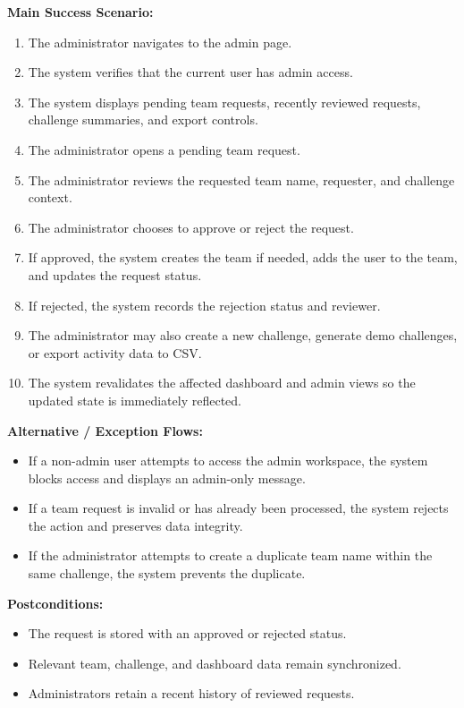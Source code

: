 \documentclass[12pt]{article}
\begin{document}
\textbf{Main Success Scenario:}
\begin{enumerate}[leftmargin=1.8em]
    \item The administrator navigates to the admin page.
    \item The system verifies that the current user has admin access.
    \item The system displays pending team requests, recently reviewed
    requests, challenge summaries, and export controls.
    \item The administrator opens a pending team request.
    \item The administrator reviews the requested team name, requester, and
    challenge context.
    \item The administrator chooses to approve or reject the request.
    \item If approved, the system creates the team if needed, adds the user to
    the team, and updates the request status.
    \item If rejected, the system records the rejection status and reviewer.
    \item The administrator may also create a new challenge, generate demo
    challenges, or export activity data to CSV.
    \item The system revalidates the affected dashboard and admin views so the
    updated state is immediately reflected.
\end{enumerate}

\textbf{Alternative / Exception Flows:}
\begin{itemize}[leftmargin=1.5em]
    \item If a non-admin user attempts to access the admin workspace, the
    system blocks access and displays an admin-only message.
    \item If a team request is invalid or has already been processed, the
    system rejects the action and preserves data integrity.
    \item If the administrator attempts to create a duplicate team name within
    the same challenge, the system prevents the duplicate.
\end{itemize}

\textbf{Postconditions:}
\begin{itemize}[leftmargin=1.5em]
    \item The request is stored with an approved or rejected status.
    \item Relevant team, challenge, and dashboard data remain synchronized.
    \item Administrators retain a recent history of reviewed requests.
\end{itemize}
\end{document}
